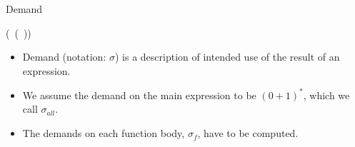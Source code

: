\documentclass[xcolor=x11names,compress,mathserif]{beamer}
\renewcommand{\(}{\begin{columns}}
\renewcommand{\)}{\end{columns}}
\newcommand{\<}[1]{\begin{column}{#1}}
\renewcommand{\>}{\end{column}}
\begin{document}
\begin{frame}{Demand}
  \begin{center}
     (\CAR\ (\CDR\ \pw)) \\
  \end{center}
  \pause
\centerline{}
  \begin{itemize}
  \item Demand  (notation: $\sigma$) is a description  of intended use
    of the result of an expression.
   \pause
\item We assume the demand on the main expression to be $(0+1)^*$,
  which we call $\sigma_{all}$.
\item The demands on each function body, $\sigma_f$, have to be computed.
  \end{itemize}




\end{frame}
\end{document}
